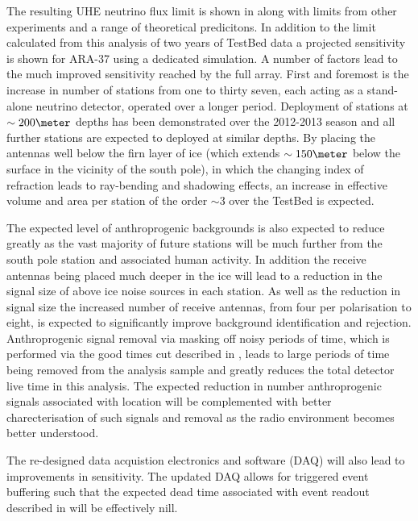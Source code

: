 The resulting UHE neutrino flux limit is shown in  along with limits from other experiments and a range of theoretical predicitons. In addition to the limit calculated from this analysis of two years of TestBed data a projected sensitivity is shown for ARA-37 using a dedicated simulation. A number of factors lead to the much improved sensitivity reached by the full array. First and foremost is the increase in number of stations from one to thirty seven, each acting as a stand-alone neutrino detector, operated over a longer period. Deployment of stations at $\sim 200 \meter$ depths has been demonstrated over the 2012-2013 season and all further stations are expected to deployed at similar depths. By placing the antennas well below the firn layer of ice (which extends $\sim 150 \meter$ below the surface in the vicinity of the south pole), in which the changing index of refraction leads to ray-bending and shadowing effects, an increase in effective volume and area per station of the order $\sim 3$ over the TestBed is expected.

The expected level of anthroprogenic backgrounds is also expected to reduce greatly as the vast majority of future stations will be much further from the south pole station and associated human activity. In addition the receive antennas being placed much deeper in the ice will lead to a reduction in the signal size of above ice noise sources in each station. As well as the reduction in signal size the increased number of receive antennas, from four per polarisation to eight, is expected to significantly improve background identification and rejection. Anthroprogenic signal removal via masking off noisy periods of time, which is performed via the good times cut described in , leads to large periods of time being removed from the analysis sample and greatly reduces the total detector live time in this analysis. The expected reduction in number anthroprogenic signals associated with location will be complemented with better charecterisation of such signals and removal as the radio environment becomes better understood.

The re-designed data acquistion electronics and software (DAQ) will also lead to improvements in sensitivity. The updated DAQ allows for triggered event buffering such that the expected dead time associated with event readout described in  will be effectively nill. 








